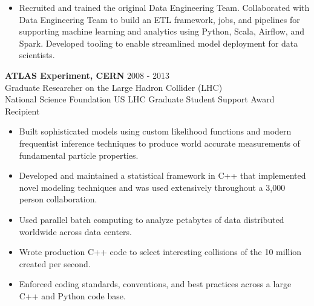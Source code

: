 \documentclass[9pt]{article}
\newenvironment{changemargin}[2]{%
  \begin{list}{}{%
    \setlength{\topsep}{0pt}%
    \setlength{\leftmargin}{#1}%
    \setlength{\rightmargin}{#2}%
    \setlength{\listparindent}{\parindent}%
    \setlength{\itemindent}{\parindent}%
    \setlength{\parsep}{\parskip}%
  }%
  \item[]}{\end{list}
}
\newenvironment{body} {
  \vspace*{-16pt}
\begin{changemargin}{-0.25in}{-0.5in}
  }
{\end{changemargin}
}
\begin{document}
\begin{body}
\begin{itemize}
    \item Recruited and trained the original Data Engineering Team.  Collaborated with Data Engineering Team to build an ETL framework, jobs, and pipelines for supporting machine learning and analytics using Python, Scala, Airflow, and Spark.  Developed tooling to enable streamlined model deployment for data scientists. \\
  \end{itemize}

        \medskip

  \textbf{ATLAS Experiment, CERN} \hfill 2008 - 2013\\
  Graduate Researcher on the Large Hadron Collider (LHC) \\
  National Science Foundation US LHC Graduate Student Support Award Recipient

  \begin{itemize}

    \item Built sophisticated models using custom likelihood functions and modern frequentist inference techniques to produce world accurate measurements of fundamental particle properties.

    \item Developed and maintained a statistical framework in C++ that implemented novel modeling techniques and was used extensively throughout a 3,000 person collaboration.

    \item Used parallel batch computing to analyze petabytes of data distributed worldwide across data centers.

    \item Wrote production C++ code to select interesting collisions of the 10 million created per second.

    \item Enforced coding standards, conventions, and best practices across a large C++ and Python code base.

  \end{itemize}

\end{body}

\smallskip
\end{document}

